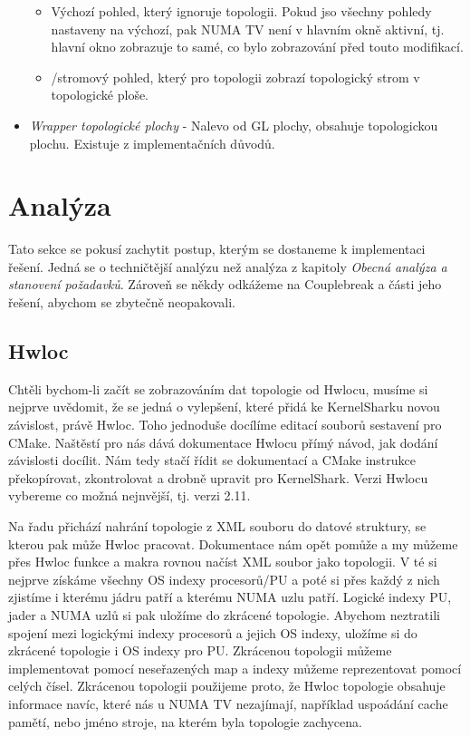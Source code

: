 \begin{itemize}
    \begin{itemize}
        \item Výchozí pohled, který ignoruje topologii. Pokud jso všechny pohledy nastaveny na výchozí, pak NUMA TV není v hlavním okně aktivní, tj. hlavní okno zobrazuje to samé, co bylo zobrazování před touto modifikací.
        \item {}/stromový pohled, který pro topologii zobrazí topologický strom v topologické ploše.
    \end{itemize}  
    \item \emph{Wrapper topologické plochy} - Nalevo od GL plochy, obsahuje topologickou plochu. Existuje z implementačních důvodů.
\end{itemize}

\section{Analýza}
Tato sekce se pokusí zachytit postup, kterým se dostaneme k implementaci řešení. Jedná se o techničtější analýzu než analýza z kapitoly \emph{Obecná analýza a stanovení požadavků}. Zároveň se někdy odkážeme na Couplebreak a části jeho řešení, abychom se zbytečně neopakovali.

\subsection{Hwloc}
Chtěli bychom-li začít se zobrazováním dat topologie od Hwlocu, musíme si nejprve uvědomit, že se jedná o vylepšení, které přidá ke KernelSharku novou závislost, právě Hwloc. Toho jednoduše docílíme editací souborů sestavení pro CMake. Naštěstí pro nás dává dokumentace Hwlocu \cite{Hwloc-Docs} přímý návod, jak dodání závislosti docílit. Nám tedy stačí řídit se dokumentací a CMake instrukce překopírovat, zkontrolovat a drobně upravit pro KernelShark. Verzi Hwlocu vybereme co možná nejnvější, tj. verzi 2.11.

Na řadu přichází nahrání topologie z XML souboru do datové struktury, se kterou pak může Hwloc pracovat. Dokumentace nám opět pomůže a my můžeme přes Hwloc funkce a makra rovnou načíst XML soubor jako topologii. V té si nejprve získáme všechny OS indexy procesorů/PU a poté si přes každý z nich zjistíme i kterému jádru patří a kterému NUMA uzlu patří. Logické indexy PU, jader a NUMA uzlů si pak uložíme do zkrácené topologie. Abychom neztratili spojení mezi logickými indexy procesorů a jejich OS indexy, uložíme si do zkrácené topologie i OS indexy pro PU. Zkrácenou topologii můžeme implementovat pomocí neseřazených map a indexy můžeme reprezentovat pomocí celých čísel. Zkrácenou topologii použijeme proto, že Hwloc topologie obsahuje informace navíc, které nás u NUMA TV nezajímají, například uspoádání cache pamětí, nebo jméno stroje, na kterém byla topologie zachycena.

